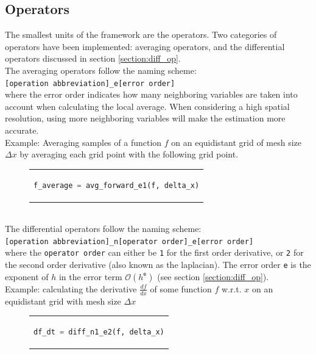 \subsection{Operators}
The smallest units of the framework are the operators.
Two categories of operators have been implemented: averaging operators, and the differential operators discussed in section \ref{section:diff_op}.\\
The averaging operators follow the naming scheme:
\\
\texttt{[operation abbreviation]\_e[error order]}
\\
where the error order indicates how many neighboring variables are taken into account when calculating the local average.
When considering a high spatial resolution, using more neighboring variables will make the estimation more accurate.\\
Example: Averaging samples of a function $f$ on an equidistant grid of mesh size $\Delta x$ by averaging each grid point with the following grid point.
\begin{figure}[htpb]
  \centering
  \begin{tabular}{c}
  \begin{lstlisting}[language=Python]
    f_average = avg_forward_e1(f, delta_x)
  \end{lstlisting}
  \end{tabular}
\end{figure}
\\
The differential operators follow the naming scheme:
\\
\texttt{[operation abbreviation]\_n[operator order]\_e[error order]}
\\ 
where the \texttt{operator order} can either be \texttt{1} for the first order derivative, or \texttt{2} for the second order derivative (also known as the laplacian).
The error order \texttt{e} is the exponent of $h$ in the error term $\mathcal{O}(h^\texttt{e})$ (see section \ref{section:diff_op}).\\
Example: calculating the derivative $\frac{df}{dx}$ of some function $f$ w.r.t. $x$ on an equidistant grid with mesh size $\Delta x$
\begin{figure}[htpb]
  \centering
  \begin{tabular}{c}
  \begin{lstlisting}[language=Python]
    df_dt = diff_n1_e2(f, delta_x)
  \end{lstlisting}
  \end{tabular}
\end{figure}

